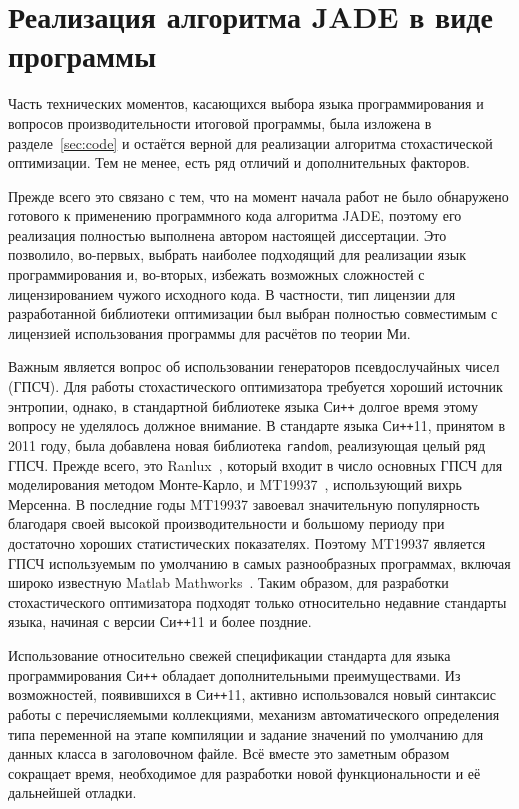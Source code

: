 \section{Реализация алгоритма JADE в виде программы}
\label{sec:jade}

Часть технических моментов, касающихся выбора языка программирования и
вопросов производительности итоговой программы, была изложена в
разделе~\ref{sec:code} и остаётся верной для реализации алгоритма
стохастической оптимизации. Тем не менее, есть ряд отличий и
дополнительных факторов.

Прежде всего это связано с тем, что на момент начала работ не было
обнаружено готового к применению программного кода алгоритма JADE, поэтому его
реализация полностью выполнена автором настоящей диссертации. Это
позволило, во-первых, выбрать наиболее подходящий для реализации язык
программирования и, во-вторых, избежать возможных сложностей с
лицензированием чужого исходного кода. В частности, тип лицензии для
разработанной библиотеки оптимизации был выбран полностью
совместимым с лицензией использования программы для расчётов по
теории Ми.

Важным является вопрос об использовании генераторов псевдослучайных
чисел (ГПСЧ). Для работы стохастического оптимизатора требуется
хороший источник энтропии, однако, в стандартной библиотеке языка
Си\texttt{++} долгое время этому вопросу не уделялось должное
внимание. В стандарте языка Си\texttt{++}11, принятом в 2011 году, была
добавлена новая библиотека \verb+random+, реализующая целый ряд
ГПСЧ. Прежде всего, это Ranlux~\cite{Luscher-RNG-Ranlux-1994}, который
входит в число основных ГПСЧ для моделирования методом Монте-Карло, и
MT19937~\cite{Matsumoto-RNG-MT-1998}, использующий вихрь Мерсенна. В
последние годы MT19937 завоевал значительную популярность благодаря
своей высокой производительности и большому периоду при достаточно
хороших статистических показателях. Поэтому MT19937 является ГПСЧ
используемым по умолчанию в самых разнообразных программах, включая
широко известную Matlab Mathworks~\cite{Matlab-web}. Таким образом, для разработки
стохастического оптимизатора подходят только относительно недавние
стандарты языка, начиная с версии Си\texttt{++}11 и более поздние.

Использование относительно свежей спецификации стандарта для языка
программирования Си\texttt{++} обладает дополнительными
преимуществами. Из возможностей, появившихся в Си\texttt{++}11,
активно использовался новый синтаксис работы с перечисляемыми
коллекциями, механизм автоматического определения типа переменной на
этапе компиляции и 
задание значений по умолчанию для данных класса в
заголовочном файле. Всё вместе это заметным образом сокращает время,
необходимое для разработки новой функциональности и её дальнейшей отладки.

